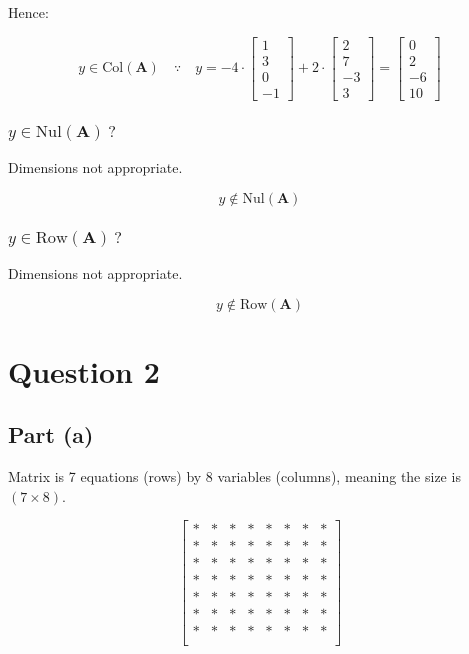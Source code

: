 \documentclass{article}
\begin{document}
Hence:

\[%
    y
    \in 
    \text{Col}(\mathbf{A})
    \quad
    \because
    \quad
    y
    =
    -4 \cdot 
    \begin{bmatrix} 1\\3\\0\\-1 \end{bmatrix}
    +
    2 \cdot 
    \begin{bmatrix} 2\\7\\-3\\3 \end{bmatrix}
    =
    \begin{bmatrix} 0\\2\\-6\\10 \end{bmatrix} 

\]%


\subsubsection{$ y \in \text{Nul}(\mathbf{A}) \ ?$}
Dimensions not appropriate.

\[%
    y  \notin \text{Nul}(\mathbf{A})
\]%

\subsubsection{$ y \in \text{Row}(\mathbf{A}) \ ?$}
Dimensions not appropriate.

\[%
    y  \notin \text{Row}(\mathbf{A})
\]%

\section{Question 2} 

\subsection{Part (a)} 
Matrix is 7 equations (rows) by 8 variables (columns), meaning the size is
$(7 \times 8)$.

\[%
    \begin{bmatrix} 
        * & * & * & * & * & * & * & * \\
        * & * & * & * & * & * & * & * \\
        * & * & * & * & * & * & * & * \\
        * & * & * & * & * & * & * & * \\
        * & * & * & * & * & * & * & * \\
        * & * & * & * & * & * & * & * \\
        * & * & * & * & * & * & * & * \\
    \end{bmatrix}
\]%
\end{document}
